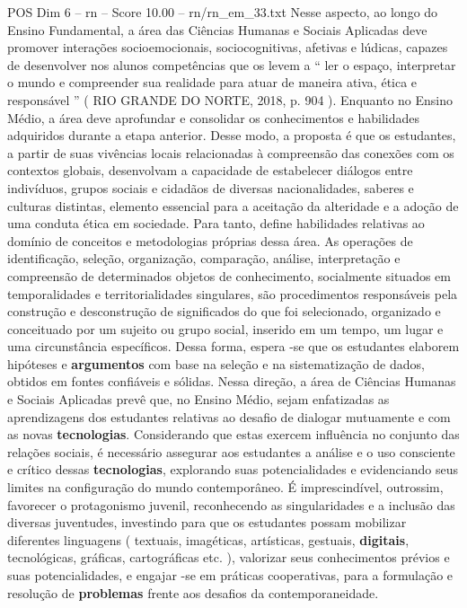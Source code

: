 \begin{textsample}{POS Dim 6 – rn – Score 10.00 – rn/rn\_em\_33.txt}  \label{ex:f6_pos_231}
Nesse aspecto, ao longo do Ensino Fundamental, a área das Ciências Humanas e Sociais Aplicadas deve promover interações socioemocionais, sociocognitivas, afetivas e lúdicas, capazes de desenvolver nos alunos competências que os levem a “ ler o espaço, interpretar o mundo e compreender sua realidade para atuar de maneira ativa, ética e responsável ” ( RIO GRANDE DO NORTE, 2018, p. 904 ).
Enquanto no Ensino Médio, a área deve aprofundar e consolidar os conhecimentos e habilidades adquiridos durante a etapa anterior.
Desse modo, a proposta é que os estudantes, a partir de suas vivências locais relacionadas à compreensão das conexões com os contextos globais, desenvolvam a capacidade de estabelecer diálogos entre indivíduos, grupos sociais e cidadãos de diversas nacionalidades, saberes e culturas distintas, elemento essencial para a aceitação da alteridade e a adoção de uma conduta ética em sociedade.
Para tanto, define habilidades relativas ao domínio de conceitos e metodologias próprias dessa área.
As operações de identificação, seleção, organização, comparação, análise, interpretação e compreensão de determinados objetos de conhecimento, socialmente situados em temporalidades e territorialidades singulares, são procedimentos responsáveis pela construção e desconstrução de significados do que foi selecionado, organizado e conceituado por um sujeito ou grupo social, inserido em um tempo, um lugar e uma circunstância específicos.
Dessa forma, espera -se que os estudantes elaborem hipóteses e \textbf{argumentos} com base na seleção e na sistematização de dados, obtidos em fontes confiáveis e sólidas.
Nessa direção, a área de Ciências Humanas e Sociais Aplicadas prevê que, no Ensino Médio, sejam enfatizadas as aprendizagens dos estudantes relativas ao desafio de dialogar mutuamente e com as novas \textbf{tecnologias}.
Considerando que estas exercem influência no conjunto das relações sociais, é necessário assegurar aos estudantes a análise e o uso consciente e crítico dessas \textbf{tecnologias}, explorando suas potencialidades e evidenciando seus limites na configuração do mundo contemporâneo.
É imprescindível, outrossim, favorecer o protagonismo juvenil, reconhecendo as singularidades e a inclusão das diversas juventudes, investindo para que os estudantes possam mobilizar diferentes linguagens ( textuais, imagéticas, artísticas, gestuais, \textbf{digitais}, tecnológicas, gráficas, cartográficas etc. ), valorizar seus conhecimentos prévios e suas potencialidades, e engajar -se em práticas cooperativas, para a formulação e resolução de \textbf{problemas} frente aos desafios da contemporaneidade.

\end{textsample}
